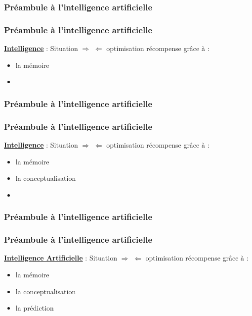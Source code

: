 \begin{frame}
  \frametitle{Préambule à l'intelligence artificielle}
\end{frame}

\begin{frame}
  \frametitle{Préambule à l'intelligence artificielle}
  \underline{\textbf{Intelligence}} :
  \newline
  \newline
  Situation $\Rightarrow$  $\Leftarrow$ optimisation récompense
  \newline
  grâce à :
  \begin{itemize}
  \item la mémoire
  \item {}
  \end{itemize}
\end{frame}

\begin{frame}
  \frametitle{Préambule à l'intelligence artificielle}
\end{frame}

\begin{frame}
  \frametitle{Préambule à l'intelligence artificielle}
  \underline{\textbf{Intelligence}} :
  \newline
  \newline
  Situation $\Rightarrow$  $\Leftarrow$ optimisation récompense
  \newline
  grâce à :
  \begin{itemize}
  \item la mémoire
  \item la conceptualisation
  \item {}
  \end{itemize}
\end{frame}

\begin{frame}
  \frametitle{Préambule à l'intelligence artificielle}
  \begin{center}
    \huge{}
  \end{center}
\end{frame}

\begin{frame}
  \frametitle{Préambule à l'intelligence artificielle}
  \underline{\textbf{Intelligence Artificielle}} :
  \newline
  \newline
  Situation $\Rightarrow$  $\Leftarrow$ optimisation récompense
  \newline
  grâce à :
  \begin{itemize}
  \item la mémoire
  \item la conceptualisation
  \item la prédiction
  \end{itemize}
\end{frame}
